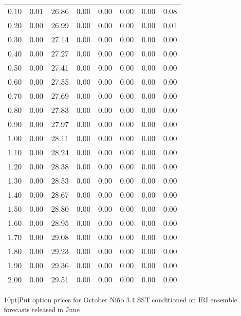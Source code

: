 \begin{table*}[ht]
\begin{tabular}{rrrrrrrr}
  0.10 & 0.01 & 26.86 & 0.00 & 0.00 & 0.00 & 0.00 & 0.08 \\ 
  0.20 & 0.00 & 26.99 & 0.00 & 0.00 & 0.00 & 0.00 & 0.01 \\ 
  0.30 & 0.00 & 27.14 & 0.00 & 0.00 & 0.00 & 0.00 & 0.00 \\ 
  0.40 & 0.00 & 27.27 & 0.00 & 0.00 & 0.00 & 0.00 & 0.00 \\ 
  0.50 & 0.00 & 27.41 & 0.00 & 0.00 & 0.00 & 0.00 & 0.00 \\ 
  0.60 & 0.00 & 27.55 & 0.00 & 0.00 & 0.00 & 0.00 & 0.00 \\ 
  0.70 & 0.00 & 27.69 & 0.00 & 0.00 & 0.00 & 0.00 & 0.00 \\ 
  0.80 & 0.00 & 27.83 & 0.00 & 0.00 & 0.00 & 0.00 & 0.00 \\ 
  0.90 & 0.00 & 27.97 & 0.00 & 0.00 & 0.00 & 0.00 & 0.00 \\ 
  1.00 & 0.00 & 28.11 & 0.00 & 0.00 & 0.00 & 0.00 & 0.00 \\ 
  1.10 & 0.00 & 28.24 & 0.00 & 0.00 & 0.00 & 0.00 & 0.00 \\ 
  1.20 & 0.00 & 28.38 & 0.00 & 0.00 & 0.00 & 0.00 & 0.00 \\ 
  1.30 & 0.00 & 28.53 & 0.00 & 0.00 & 0.00 & 0.00 & 0.00 \\ 
  1.40 & 0.00 & 28.67 & 0.00 & 0.00 & 0.00 & 0.00 & 0.00 \\ 
  1.50 & 0.00 & 28.80 & 0.00 & 0.00 & 0.00 & 0.00 & 0.00 \\ 
  1.60 & 0.00 & 28.95 & 0.00 & 0.00 & 0.00 & 0.00 & 0.00 \\ 
  1.70 & 0.00 & 29.08 & 0.00 & 0.00 & 0.00 & 0.00 & 0.00 \\ 
  1.80 & 0.00 & 29.23 & 0.00 & 0.00 & 0.00 & 0.00 & 0.00 \\ 
  1.90 & 0.00 & 29.36 & 0.00 & 0.00 & 0.00 & 0.00 & 0.00 \\ 
  2.00 & 0.00 & 29.51 & 0.00 & 0.00 & 0.00 & 0.00 & 0.00 \\ 
   \hline
\end{tabular}
\caption[Put option prices for October Ni\~no 3.4 SST conditioned on IRI ensemble forecasts released in June][10pt]{Put option prices for October Ni\~no 3.4 SST conditioned on IRI ensemble forecasts released in June} 
\label{tab:pricesOctSub}
\end{table*}
